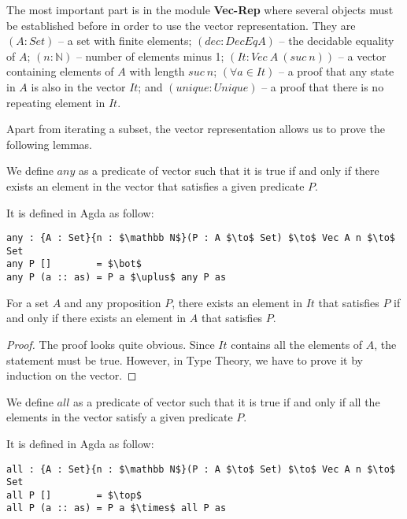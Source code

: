 \par The most important part is in the module \textbf{Vec-Rep} where
several objects must be established before in order to use the vector
representation. They are \((A : Set)\) -- a set with finite elements;
\((dec : DecEq A)\) -- the decidable equality of \(A\); \((n : \mathbb
N)\) -- number of elements minus 1; \((It : Vec\ A\ (suc\ n))\) -- a
vector containing elements of \(A\) with length \(suc\ n\); \((\forall
a\in It)\) -- a proof that any state in \(A\) is also in the vector
\(It\); and \((unique : Unique)\) -- a proof that there is no repeating
element in \(It\). 

\par Apart from iterating a subset, the vector representation allows
us to prove the following lemmas. 

\begin{defn}
\noindent We define \(any\) as a predicate of vector such that it is
true if and only if there exists an element in the vector that satisfies a given
predicate \(P\). 
\end{defn}

\par It is defined in Agda as follow:
\begin{lstlisting}[mathescape=true,xleftmargin=.3\textwidth]
any : {A : Set}{n : $\mathbb N$}(P : A $\to$ Set) $\to$ Vec A n $\to$ Set
any P []        = $\bot$
any P (a :: as) = P a $\uplus$ any P as
\end{lstlisting} 

\begin{lem}
\noindent For a set \(A\) and any proposition \(P\), there exists an
element in \(It\) that satisfies \(P\) if and only if there exists an
element in \(A\) that satisfies \(P\). 
\end{lem}

\begin{proof}
\noindent The proof looks quite obvious. Since \(It\) contains all the
elements of \(A\), the statement must be true. However, in Type
Theory, we have to prove it by induction on the vector.
\end{proof}

\begin{defn}
\noindent We define \(all\) as a predicate of vector such that it is
true if and only if all the elements in the vector satisfy a given
predicate \(P\). 
\end{defn}

\par It is defined in Agda as follow:
\begin{lstlisting}[mathescape=true,xleftmargin=.3\textwidth]
all : {A : Set}{n : $\mathbb N$}(P : A $\to$ Set) $\to$ Vec A n $\to$ Set
all P []        = $\top$
all P (a :: as) = P a $\times$ all P as
\end{lstlisting} 

